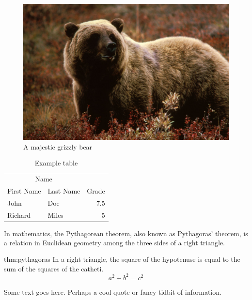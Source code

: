 \documentclass[10pt, a4paper, twocolumn]{book}
\begin{document}
\begin{figure}
	\includegraphics[width=\linewidth]{bear.jpg} %
	\caption{A majestic grizzly bear} %
	\label{bear} %
\end{figure}

\lipsum[6-10]

\begin{table}
	\caption{Example table}
	\centering
	\begin{tabular}{llr}
		\toprule
		\multicolumn{2}{c}{Name} \\
		\cmidrule(r){1-2}
		First Name & Last Name & Grade \\
		\midrule
		John & Doe & $7.5$ \\
		Richard & Miles & $5$ \\
		\bottomrule
	\end{tabular}
\end{table}

\lipsum[11]

In mathematics, the Pythagorean theorem, also known as Pythagoras' theorem, is a relation in Euclidean geometry among the three sides of a right triangle.

\begin{fancybox}{thm:pythagoras}
	In a right triangle, the square of the hypotenuse is equal to the sum of the squares of the catheti.
	$$a^2+b^2=c^2$$
\end{fancybox}

\lipsum[11-18]

\begin{formal}
	Some text goes here. Perhaps a cool quote or fancy tidbit of information.
\end{formal}
\end{document}
